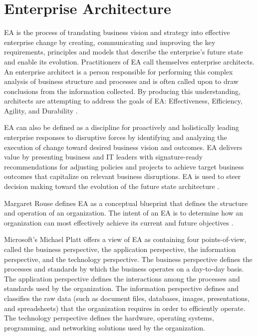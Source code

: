 \documentclass[12pt,a4paper,final,twoside,onecolumn,titlepage]{book}
\begin{document}
\section{Enterprise Architecture}
\gls{EA} is the process of translating business vision and strategy into effective enterprise change by creating, communicating and improving the key requirements, principles and models that describe the enterprise's future state and enable its evolution. Practitioners of EA call themselves enterprise architects. An enterprise architect is a person responsible for performing this complex analysis of business structure and processes and is often called upon to draw conclusions from the information collected. By producing this understanding, architects are attempting to address the goals of \gls{EA}: Effectiveness, Efficiency, Agility, and Durability \cite{ES02}. 

\gls{EA} can also be defined as a discipline for proactively and holistically leading enterprise responses to disruptive forces by identifying and analyzing the execution of change toward desired business vision and outcomes. EA delivers value by presenting business and IT leaders with signature-ready recommendations for adjusting policies and projects to achieve target business outcomes that capitalize on relevant business disruptions. EA is used to steer decision making toward the evolution of the future state architecture \cite{ES03}.

Margaret Rouse defines \gls{EA} as a conceptual blueprint that defines the structure and operation of an organization. The intent of an \gls{EA} is to determine how an organization can most effectively achieve its current and future objectives \cite{ES04}.

Microsoft's Michael Platt offers a view of \gls{EA} as containing four points-of-view, called the business perspective, the application perspective, the information perspective, and the technology perspective. The business perspective defines the processes and standards by which the business operates on a day-to-day basis. The application perspective defines the interactions among the processes and standards used by the organization. The information perspective defines and classifies the raw data (such as document files, databases, images, presentations, and spreadsheets) that the organization requires in order to efficiently operate. The technology perspective defines the hardware, operating systems, programming, and networking solutions used by the organization.
\end{document}
